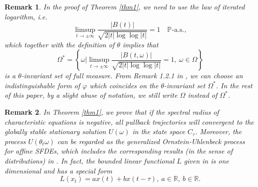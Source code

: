 \documentclass[preprint,12pt]{elsarticle}
\newtheorem{remark}{Remark}[section]
\begin{document}
\begin{remark}
{\rm In the proof of Theorem \ref{thm1}, we need to use the law of iterated logarithm, i.e.
\[
\limsup_{t\rightarrow\pm\infty}\frac{|B(t)|}{\sqrt{2|t|\log\log|t|}}=1\quad \mathbb{P}\mbox{-a.s.},
\]
which together with the definition of $\theta$ implies that
\begin{equation}\label{Law}\Omega^*=\left\{\omega\Bigg|\limsup_{t\rightarrow\pm\infty}\frac{|B(t,\omega)|}{\sqrt{2|t|\log\log|t|}}=1,\ \omega\in\Omega\right\}\end{equation}
is a $\theta$-invariant set of full measure. From Remark 1.2.1 in \cite{Chu}, we can choose an indistinguishable form of $\varphi$ which coincides on the $\theta$-invariant set $\Omega^*$. In the rest of this paper, by a slight abuse of notation, we still write $\Omega$ instead of $\Omega^*$.
}
\end{remark}

\begin{remark}
{\rm In Theorem \ref{thm1}, we prove that if the spectral radius of characteristic equations is negative, all pullback trajectories will convergent to the globally stable stationary solution $U(\omega)$ in the state space $C_\tau$. Moreover, the process  $U(\theta_{t}\omega)$ can be regarded as the generalized Ornstein-Uhlenbeck process for affine SFDEs, which includes the corresponding results (in the sense of distributions) in \cite{KMen}.  In fact, the bounded linear functional $L$ given in \cite{KMen} is one dimensional and has a special form
\[L(x_t)=ax(t)+bx(t-\tau),\ a\in\mathbb{R},\ b\in\mathbb{R}.\]
}
\end{remark}
\end{document}
